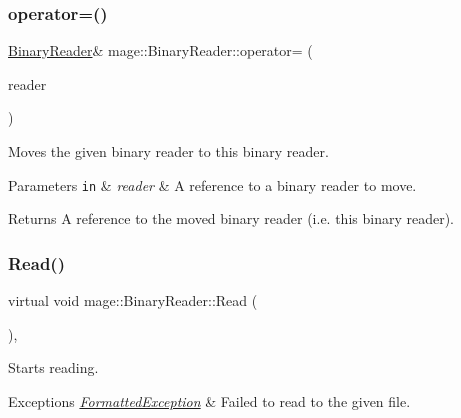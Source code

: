 \subsubsection{\texorpdfstring{operator=()}{operator=()}\hspace{0.1cm}{\footnotesize\ttfamily [2/2]}}
{\footnotesize\ttfamily \hyperlink{classmage_1_1_binary_reader}{Binary\+Reader}\& mage\+::\+Binary\+Reader\+::operator= (\begin{DoxyParamCaption}\item[{\hyperlink{classmage_1_1_binary_reader}{Binary\+Reader} \&\&}]{reader }\end{DoxyParamCaption})\hspace{0.3cm}{\ttfamily [delete]}}

Moves the given binary reader to this binary reader.


\begin{DoxyParams}[1]{Parameters}
\mbox{\tt in}  & {\em reader} & A reference to a binary reader to move. \\
\hline
\end{DoxyParams}
\begin{DoxyReturn}{Returns}
A reference to the moved binary reader (i.\+e. this binary reader). 
\end{DoxyReturn}
\hypertarget{classmage_1_1_binary_reader_a5c060c165f17a71f4218eb98c7091273}{}\label{classmage_1_1_binary_reader_a5c060c165f17a71f4218eb98c7091273} 
\subsubsection{\texorpdfstring{Read()}{Read()}}
{\footnotesize\ttfamily virtual void mage\+::\+Binary\+Reader\+::\+Read (\begin{DoxyParamCaption}{ }\end{DoxyParamCaption})\hspace{0.3cm}{\ttfamily [private]}, {}}

Starts reading.


\begin{DoxyExceptions}{Exceptions}
{\em \hyperlink{structmage_1_1_formatted_exception}{Formatted\+Exception}} & Failed to read to the given file. \\
\hline
\end{DoxyExceptions}
\hypertarget{classmage_1_1_binary_reader_af1e0e4ab815e23c72ab65fd7c0748d3f}{}\label{classmage_1_1_binary_reader_af1e0e4ab815e23c72ab65fd7c0748d3f} 
